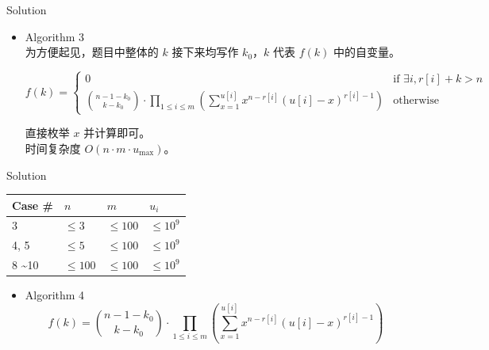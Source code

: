 \documentclass[UTF8]{beamer}
\begin{document}
\begin{frame}{Solution}

\begin{itemize}
    \item Algorithm 3 \\
        为方便起见，题目中整体的 $k$ 接下来均写作 $k_0$，$k$ 代表 $f(k)$ 中的自变量。

        \pause
        \begin{equation*}
            f(k) =
            \begin{cases}
                0   &\mbox{if $\exists i, r[i] + k > n$} \\
                \binom{n - 1 - k_0}{k - k_0} \cdot
                \prod_{1 \leq i \leq m}
                \left( \sum_{x = 1}^{u[i]} x^{n - r[i]} (u[i] - x)^{r[i] - 1} \right)   &\mbox{otherwise}
            \end{cases}
        \end{equation*}

        \pause
        直接枚举 $x$ 并计算即可。\\
        时间复杂度 $O(n \cdot m \cdot u_{\max})$。
\end{itemize}

\end{frame}

\begin{frame}{Solution}

\begin{tabularx}{\textwidth}{X|X|X|X} \hline
Case \# & $n$ & $m$ & $u_i$ \\ \hline \hline
3    & $\leq 3$   & $\leq 100$ & $\leq 10^9$ \\ \hline
4, 5 & $\leq 5$   & $\leq 100$ & $\leq 10^9$ \\ \hline
8 \textasciitilde 10 & $\leq 100$ & $\leq 100$ & $\leq 10^9$ \\ \hline
\end{tabularx}
\begin{itemize}
    \item Algorithm 4 \\
        $$
            f(k) =
                \binom{n - 1 - k_0}{k - k_0} \cdot
                \prod_{1 \leq i \leq m}
                \left( \sum_{x = 1}^{u[i]} x^{n - r[i]} (u[i] - x)^{r[i] - 1} \right)
        $$
\end{itemize}

\end{frame}
\end{document}
